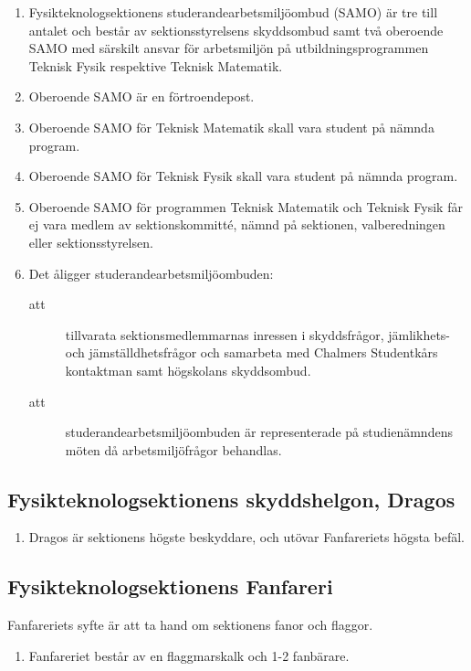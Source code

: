 \documentclass[11pt,a4paper]{article}
\begin{document}
\begin{enumerate}[\thesubsection .1]

  \item Fysikteknologsektionens studerandearbetsmiljöombud (SAMO) är tre till
  antal\-et och består av sektionsstyrelsens skyddsombud samt två oberoende SAMO med
  särskilt ansvar för arbetsmiljön på utbildningsprogrammen Teknisk
  Fysik respektive Teknisk Matematik.
  
  \item Oberoende SAMO är en förtroendepost.
  
\item Oberoende SAMO för Teknisk Matematik skall vara student på nämnda program.

\item Oberoende SAMO för Teknisk Fysik skall vara student på nämnda program.

\item Oberoende SAMO för programmen Teknisk Matematik och Teknisk Fysik får ej vara medlem av sektionskommitté, nämnd på sektionen, valberedningen eller sektionsstyrelsen.

  \item Det åligger studerandearbetsmiljöombuden:
    \begin{description}
      \item[att] tillvarata sektionsmedlemmarnas inressen i
      skyddsfrågor, jäm\-lik\-hets- och jämställdhetsfrågor och samarbeta
      med Chalmers Studentkårs kontaktman samt högskolans skyddsombud.
      \item[att] studerandearbetsmiljöombuden är representerade på
      studienämndens möten då arbetsmiljöfrågor behandlas.
    \end{description}

\end{enumerate}

\subsection{Fysikteknologsektionens skyddshelgon, Dragos}

\begin{enumerate}[\thesubsection .1]
  \item Dragos är sektionens högste beskyddare, och utövar Fanfareriets hög\-sta befäl.
\end{enumerate}


\subsection{Fysikteknologsektionens Fanfareri}
Fanfareriets syfte är att ta hand om sektionens fanor och flaggor.
\begin{enumerate}[\thesubsection .1]

  \item Fanfareriet består av en flaggmarskalk och 1-2 fanbärare.


\end{enumerate}
\end{document}
